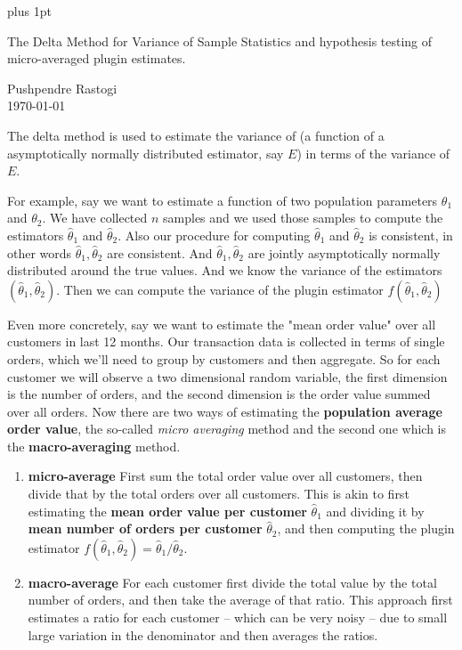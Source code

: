 \documentclass[preview,border={30 30 30 30}]{standalone}
\newcommand{\h}{\hat{\theta}}
\begin{document}
\parskip=5pt plus 1pt
\begin{center}
    \Large The Delta Method for Variance of Sample Statistics and hypothesis testing of micro-averaged plugin estimates.
\end{center}
Pushpendre Rastogi\\
\today

The delta method is used to estimate the variance of (a function of a asymptotically normally distributed estimator, say $E$) in terms of the variance of $E$.

For example, say we want to estimate a function of two population parameters $\theta_1$ and $\theta_2$. We have collected $n$ samples and we used those samples to compute the estimators $\h_1$ and $\h{_2}$. Also our procedure for computing $\h_1$ and $\h_2$ is consistent, in other words $\h_1, \h_2$ are consistent. And $\h_1, \h_2$ are jointly asymptotically normally distributed around the true values. And we know the variance of the estimators $(\h_1, \h_2)$. Then we can compute the variance of the plugin estimator $f(\h_1, \h_2)$ 

Even more concretely, say we want to estimate the "mean order value" over all customers in last 12 months. Our transaction data is collected in terms of single orders, which we'll need to group by customers and then aggregate. So for each customer we will observe a two dimensional random variable, the first dimension is the number of orders, and the second dimension is the order value  summed over all orders. Now there are two ways of estimating the \textbf{population average order value}, the so-called \textit{micro averaging} method and the second one which is the \textbf{macro-averaging} method.

\begin{enumerate}
    \item \textbf{micro-average} First sum the total order value over all customers, then divide that by the total orders over all customers. This is akin to first estimating the \textbf{mean order value per customer} $\h_1$ and dividing it by \textbf{mean number of orders per customer} $\h_2$, and then computing the plugin estimator $f(\h_1, \h_2) = \h_1 / \h_2$.
    \item \textbf{macro-average} For each customer first divide the total value by the total number of orders, and then take the average of that ratio. This approach first estimates a ratio for each customer -- which can be very noisy -- due to small large variation in the denominator and then averages the ratios.
\end{enumerate}
\end{document}
